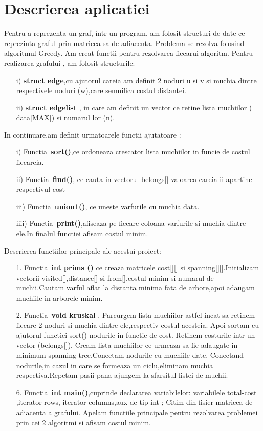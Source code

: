 \documentclass[12pt]{article}
\begin{document}
\section{Descrierea aplicatiei}
Pentru a reprezenta un graf, într-un program, am folosit structuri de date ce reprezinta graful prin  matricea sa de adiacenta. Problema se rezolva folosind algoritmul Greedy. Am creat functii pentru rezolvarea fiecarui algoritm.
Pentru realizarea grafului , am folosit structurile:
\begin{itemize}
  \item [i)]{\bf struct edge},cu ajutorul careia am definit 2 noduri u si v si muchia dintre respectivele noduri (w),care semnifica costul distantei.
  \item [ii)]{\bf struct edgelist} , in care am definit un vector ce retine lista muchiilor ( data[MAX]) si numarul lor (n).
\end{itemize}
In continuare,am definit urmatoarele functii ajutatoare  :
\begin{itemize}
  \item [i)]Functia\ {\bf sort()},ce ordoneaza crescator lista muchiilor in funcie de costul fiecareia.
  \item [ii)]Functia\ {\bf find()}, ce cauta in vectorul belongs[] valoarea careia ii apartine respectivul cost
  \item [iii)]Functia\ {\bf union1()}, ce uneste varfurile cu muchia data.
  \item [iiii)]Functia\ {\bf print()},afiseaza pe fiecare coloana varfurile si muchia dintre ele.In finalul functiei afisam costul minim. \end{itemize}  
Descrierea functiilor principale ale acestui proiect:
\begin{enumerate}
  \item [1.]Functia\ {\bf int prims ()} ce creaza matricele cost[][] si spanning[][].Initializam vectorii visited[],distance[] si from[],costul minim si numarul de muchii.Cautam varful aflat la distanta minima fata de arbore,apoi adaugam muchiile in arborele minim. 
  \item [2.]Functia\ {\bf void kruskal } . Parcurgem lista muchiilor astfel incat sa retinem fiecare 2 noduri si muchia dintre ele,respectiv costul acesteia. Apoi sortam cu ajutorul functiei sort() nodurile in functie de cost. Retinem costurile intr-un vector (belongs[]). Cream lista muchiilor ce urmeaza sa fie adaugate in minimum spanning tree.Conectam nodurile cu muchiile date. Conectand nodurile,in cazul in care se formeaza un ciclu,eliminam muchia respectiva.Repetam pasii pana ajungem la sfarsitul listei de muchii.
  
  
 
  \item [6.]Functia\ {\bf int main()},cuprinde declararea variabilelor: variabilele  total-cost ,iterator-rows, iterator-columns,aux  de tip int ;
  Citim din fisier matricea de adiacenta a grafului.
  Apelam functiile principale pentru rezolvarea problemei prin cei 2 algoritmi si afisam costul minim.

\end{enumerate}
\pagebreak
\end{document}
